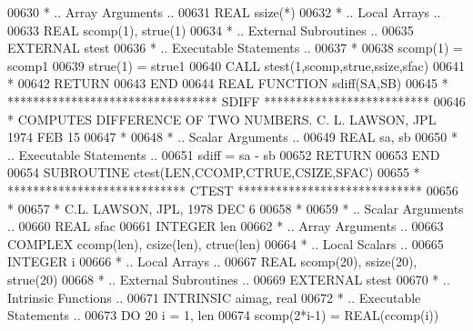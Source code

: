 \begin{DoxyCode}
00630 \textcolor{comment}{*     .. Array Arguments ..}
00631       \textcolor{keywordtype}{REAL}              ssize(*)
00632 \textcolor{comment}{*     .. Local Arrays ..}
00633       \textcolor{keywordtype}{REAL}              scomp(1), strue(1)
00634 \textcolor{comment}{*     .. External Subroutines ..}
00635       \textcolor{keywordtype}{EXTERNAL}          stest
00636 \textcolor{comment}{*     .. Executable Statements ..}
00637 \textcolor{comment}{*}
00638       scomp(1) = scomp1
00639       strue(1) = strue1
00640       \textcolor{keyword}{CALL }stest(1,scomp,strue,ssize,sfac)
00641 \textcolor{comment}{*}
00642       \textcolor{keywordflow}{RETURN}
00643 \textcolor{keyword}{      END}
00644 \textcolor{keyword}{      REAL             }\textcolor{keyword}{FUNCTION }sdiff(SA,SB)
00645 \textcolor{comment}{*     ********************************* SDIFF **************************}
00646 \textcolor{comment}{*     COMPUTES DIFFERENCE OF TWO NUMBERS.  C. L. LAWSON, JPL 1974 FEB 15}
00647 \textcolor{comment}{*}
00648 \textcolor{comment}{*     .. Scalar Arguments ..}
00649       \textcolor{keywordtype}{REAL}                            sa, sb
00650 \textcolor{comment}{*     .. Executable Statements ..}
00651       sdiff = sa - sb
00652       \textcolor{keywordflow}{RETURN}
00653 \textcolor{keyword}{      END}
00654 \textcolor{keyword}{      SUBROUTINE }ctest(LEN,CCOMP,CTRUE,CSIZE,SFAC)
00655 \textcolor{comment}{*     **************************** CTEST *****************************}
00656 \textcolor{comment}{*}
00657 \textcolor{comment}{*     C.L. LAWSON, JPL, 1978 DEC 6}
00658 \textcolor{comment}{*}
00659 \textcolor{comment}{*     .. Scalar Arguments ..}
00660       \textcolor{keywordtype}{REAL}             sfac
00661       \textcolor{keywordtype}{INTEGER}          len
00662 \textcolor{comment}{*     .. Array Arguments ..}
00663       \textcolor{keywordtype}{COMPLEX}          ccomp(len), csize(len), ctrue(len)
00664 \textcolor{comment}{*     .. Local Scalars ..}
00665       \textcolor{keywordtype}{INTEGER}          i
00666 \textcolor{comment}{*     .. Local Arrays ..}
00667       \textcolor{keywordtype}{REAL}             scomp(20), ssize(20), strue(20)
00668 \textcolor{comment}{*     .. External Subroutines ..}
00669       \textcolor{keywordtype}{EXTERNAL}         stest
00670 \textcolor{comment}{*     .. Intrinsic Functions ..}
00671       \textcolor{keywordtype}{INTRINSIC}        aimag, real
00672 \textcolor{comment}{*     .. Executable Statements ..}
00673       \textcolor{keywordflow}{DO} 20 i = 1, len
00674          scomp(2*i-1) = \textcolor{keywordtype}{REAL}(ccomp(i))

\end{DoxyCode}
